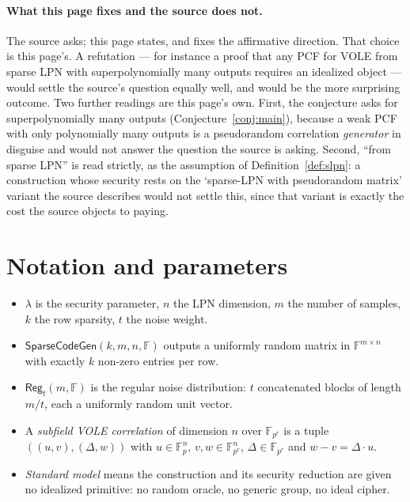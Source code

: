 \documentclass{conjura-conjecture}
\newcommand{\F}{\mathbb{F}}
\newcommand{\SparseCodeGen}{\mathsf{SparseCodeGen}}
\newcommand{\Reg}{\mathsf{Reg}}
\begin{document}
\paragraph{What this page fixes and the source does not.}
The source asks; this page states, and fixes the affirmative direction.
That choice is this page's. A refutation --- for instance a proof that
any PCF for VOLE from sparse LPN with superpolynomially many outputs
requires an idealized object --- would settle the source's question
equally well, and would be the more surprising outcome. Two further
readings are this page's own. First, the conjecture asks for
superpolynomially many outputs (Conjecture~\ref{conj:main}), because a
weak PCF with only polynomially many outputs is a pseudorandom
correlation \emph{generator} in disguise and would not answer the
question the source is asking. Second, ``from sparse LPN'' is read
strictly, as the assumption of Definition~\ref{def:slpn}: a construction
whose security rests on the `sparse-LPN with pseudorandom matrix'
variant the source describes would not settle this, since that variant
is exactly the cost the source objects to paying.

\section{Notation and parameters}\label{sec:notation}

\begin{itemize}[nosep]
  \item $\lambda$ is the security parameter, $n$ the LPN dimension, $m$
    the number of samples, $k$ the row sparsity, $t$ the noise weight.
  \item $\SparseCodeGen(k, m, n, \F)$ outputs a uniformly random matrix
    in $\F^{m \times n}$ with exactly $k$ non-zero entries per row.
  \item $\Reg_{t}(m, \F)$ is the regular noise distribution: $t$
    concatenated blocks of length $m/t$, each a uniformly random unit
    vector.
  \item A \emph{subfield VOLE correlation} of dimension $n$ over
    $\F_{p^{r}}$ is a tuple $((u, v), (\Delta, w))$ with
    $u \in \F_{p}^{n}$, $v, w \in \F_{p^{r}}^{n}$,
    $\Delta \in \F_{p^{r}}$ and $w - v = \Delta \cdot u$.
  \item \emph{Standard model} means the construction and its security
    reduction are given no idealized primitive: no random oracle, no
    generic group, no ideal cipher.
\end{itemize}
\end{document}
